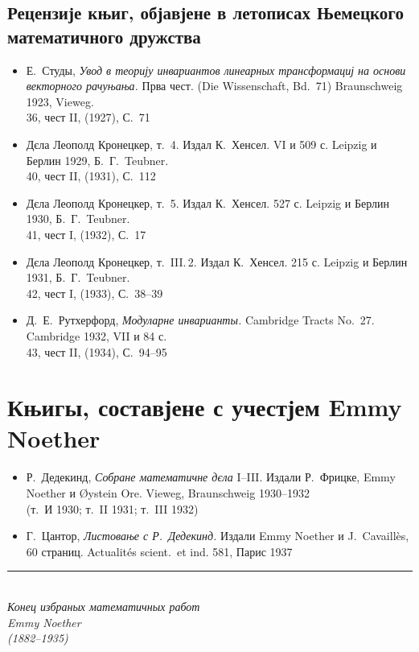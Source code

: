 \documentclass[11pt]{article}
\newcommand{\foreign}[1]{#1}
\begin{document}
\subsection*{Рецензије књиг, објавјене в летописах Њемецкого математичного дружства}

\begin{itemize}[leftmargin=1.5em,itemsep=0.2em]
\item Е.\ Студы, \textit{Увод в теорију инвариантов линеарных трансформациј на основи векторного рачуњања.} Прва чест. (\foreign{Die Wissenschaft}, Bd.~71) \foreign{Braunschweig} 1923, \foreign{Vieweg}.\\
36, чест II, (1927), С.~71

\item Дєла Леополд Кронецкер, т.~4. Издал К.\ Хенсел. VI и 509 с. Leipzig и Берлин 1929, Б.\ Г.\ Teubner.\\
40, чест II, (1931), С.~112

\item Дєла Леополд Кронецкер, т.~5. Издал К.\ Хенсел. 527 с. Leipzig и Берлин 1930, Б.\ Г.\ Teubner.\\
41, чест I, (1932), С.~17

\item Дєла Леополд Кронецкер, т.~III.\,2. Издал К.\ Хенсел. 215 с. Leipzig и Берлин 1931, Б.\ Г.\ Teubner.\\
42, чест I, (1933), С.~38--39

\item Д.\ Е.\ Рутхерфорд, \textit{Модуларне инварианты.} \foreign{Cambridge Tracts No.~27.} Cambridge 1932, VII и 84 с.\\
43, чест II, (1934), С.~94--95
\end{itemize}

\newpage
\section*{Књигы, составјене с учестјем Emmy Noether}

\begin{itemize}[leftmargin=1.5em,itemsep=0.5em]
\item Р.\ Дедекинд, \textit{Собране математичне дєла} I--III. Издали Р.\ Фрицке, Emmy Noether и \foreign{Øystein Ore}. \foreign{Vieweg}, \foreign{Braunschweig} 1930--1932\\
(т.~И 1930; т.~II 1931; т.~III 1932)

\item Г.\ Цантор, \textit{Листовање с Р.\ Дедекинд.} Издали Emmy Noether и \foreign{J.\ Cavaillès}, 60 страниц. \foreign{Actualités scient.\ et ind.} 581, Парис 1937
\end{itemize}

\vfill

\begin{center}
\rule{0.5\textwidth}{0.4pt}\\[1em]
\textit{Конец избраных математичных работ}\\[0.5em]
\textit{Emmy Noether}\\[0.5em]
\textit{(1882--1935)}
\end{center}
\end{document}
